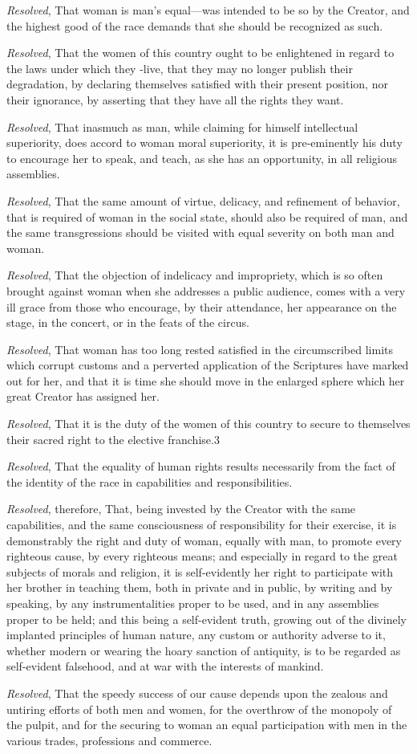 \documentclass{article}
\begin{document}
\emph{Resolved}, That woman is man's equal—was intended to be so by the
Creator, and the highest good of the race demands that she should be recognized
as such.

\emph{Resolved}, That the women of this country ought to be enlightened in
regard to the laws under which they -live, that they may no longer publish
their degradation, by declaring themselves satisfied with their present
position, nor their ignorance, by asserting that they have all the rights they
want.

\emph{Resolved}, That inasmuch as man, while claiming for himself intellectual
superiority, does accord to woman moral superiority, it is pre-eminently his
duty to encourage her to speak, and teach, as she has an opportunity, in all
religious assemblies.

\emph{Resolved}, That the same amount of virtue, delicacy, and refinement of
behavior, that is required of woman in the social state, should also be
required of man, and the same transgressions should be visited with equal
severity on both man and woman.

\emph{Resolved}, That the objection of indelicacy and impropriety, which is so
often brought against woman when she addresses a public audience, comes with a
very ill grace from those who encourage, by their attendance, her appearance on
the stage, in the concert, or in the feats of the circus.

\emph{Resolved}, That woman has too long rested satisfied in the circumscribed
limits which corrupt customs and a perverted application of the Scriptures have
marked out for her, and that it is time she should move in the enlarged sphere
which her great Creator has assigned her.

\emph{Resolved}, That it is the duty of the women of this country to secure to
themselves their sacred right to the elective franchise.3

\emph{Resolved}, That the equality of human rights results necessarily from the
fact of the identity of the race in capabilities and responsibilities.

\emph{Resolved}, therefore, That, being invested by the Creator with the same
capabilities, and the same consciousness of responsibility for their exercise,
it is demonstrably the right and duty of woman, equally with man, to promote
every righteous cause, by every righteous means; and especially in regard to
the great subjects of morals and religion, it is self-evidently her right to
participate with her brother in teaching them, both in private and in public,
by writing and by speaking, by any instrumentalities proper to be used, and in
any assemblies proper to be held; and this being a self-evident truth, growing
out of the divinely implanted principles of human nature, any custom or
authority adverse to it, whether modern or wearing the hoary sanction of
antiquity, is to be regarded as self-evident falsehood, and at war with the
interests of mankind. 

\emph{Resolved}, That the speedy success of our cause depends upon the zealous
and untiring efforts of both men and women, for the overthrow of the monopoly
of the pulpit, and for the securing to woman an equal participation with men in
the various trades, professions and commerce.
\end{document}
